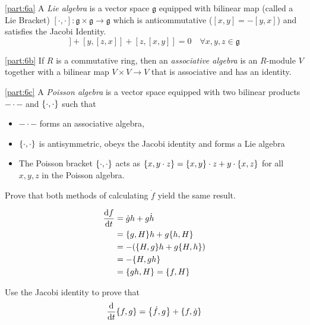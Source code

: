 \documentclass[boxes]{homework}
\makeatletter
\numberwithin{@problem}{section}
\makeatother
\begin{document}
\begin{solution}
	\ref{part:6a}
	A \emph{Lie algebra} is a vector space $\mathfrak{g}$ equipped with bilinear map (called a Lie Bracket) $[\cdot, \cdot]: \mathfrak{g}\times\mathfrak{g}\to\mathfrak{g}$ which is anticommutative ($[x, y] = -[y, x]$) and satisfies the Jacobi Identity.
	\begin{equation*}
		[x, [y, z]] + [y, [z, x]] + [z, [x, y]] = 0 \quad\forall x,y,z\in\mathfrak{g}
	\end{equation*}

	\ref{part:6b}
	If $R$ is a commutative ring, then an \emph{associative algebra} is an $R$-module $V$ together with a bilinear map $V\times V \to V$ that is associative and has an identity.

	\ref{part:6c}
	A \emph{Poisson algebra} is a vector space equipped with two bilinear products $-\cdot-$ and $\pb{\cdot}{\cdot}$ such that
	\begin{itemize}
		\item $-\cdot-$ forms an associative algebra,
		\item $\pb{\cdot}{\cdot}$ is antisymmetric, obeys the Jacobi identity and forms a Lie algebra
		\item The Poisson bracket $\pb{\cdot}{\cdot}$ acts as $\pb{x}{y\cdot z} = \pb{x}{y}\cdot z + y\cdot\pb{x}{z}$ for all $x,y,z$ in the Poisson algebra.
	\end{itemize}
\end{solution}

\begin{problem}
Prove that both methods of calculating $\dot{f}$ yield the same result.
\end{problem}

\begin{solution}
	\begin{align*}
		\dv{f}{t} & = \dot{g}h + g\dot{h}            \\
		          & = \pb{g}{H}h + g\pb{h}{H}        \\
		          & = -\qty(\pb{H}{g}h + g\pb{H}{h}) \\
		          & = -\pb{H}{gh}                    \\
		          & = \pb{gh}{H} = \pb{f}{H}
	\end{align*}
\end{solution}

\begin{problem}
Use the Jacobi identity to prove that
\begin{equation*}
	\dv{t}\pb{f}{g} = \pb{\dot{f}}{g} + \pb{f}{\dot{g}}
\end{equation*}
\end{problem}
\end{document}
